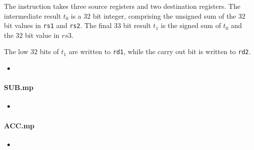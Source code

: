 The  instruction takes three source registers and two
destination registers. The intermediate result $t_0$ is a $32$
bit integer, comprising the unsigned sum of the $32$ bit values in
{\tt rs1} and {\tt rs2}. The final $33$ bit result $t_1$ is the signed
sum of $t_0$ and the $32$ bit value in $rs3$.

The low $32$ bits of $t_1$ are written to {\tt rd1}, while the carry out
bit is written to {\tt rd2}.

\begin{itemize}
\item {}
\end{itemize}

\paragraph{SUB.mp}

\begin{itemize}
\item {}
\end{itemize}

\paragraph{ACC.mp}

\begin{itemize}
\item {}
\end{itemize}

